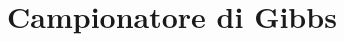 \documentclass[\main/main.tex]{subfiles}
\begin{document}
\section{Campionatore di Gibbs}
\end{document}
